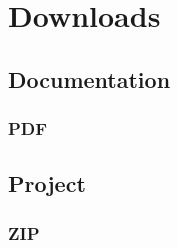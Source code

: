 \documentclass[letterpaper,10pt,english]{sphinxmanual}
\begin{document}
\chapter{Downloads}
\label{\detokenize{downloads:downloads}}\label{\detokenize{downloads::doc}}

\section{Documentation}
\label{\detokenize{downloads:documentation}}

\subsection{PDF}
\label{\detokenize{downloads:pdf}}


\section{Project}
\label{\detokenize{downloads:project}}

\subsection{ZIP}
\label{\detokenize{downloads:zip}}



\renewcommand{\indexname}{Index}
\printindex
\end{document}
